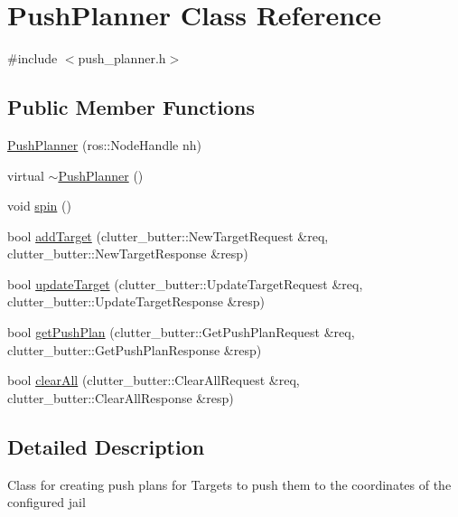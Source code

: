 \hypertarget{classPushPlanner}{\section{Push\-Planner Class Reference}
\label{classPushPlanner}
}


{\ttfamily \#include $<$push\-\_\-planner.\-h$>$}

\subsection*{Public Member Functions}
\begin{DoxyCompactItemize}
\item 
\hyperlink{classPushPlanner_ac1b2ae2c44fd03a47fc04a88a3e4556d}{Push\-Planner} (ros\-::\-Node\-Handle nh)
\item 
virtual \hyperlink{classPushPlanner_ab34cd4e65db16ba204df5ef38b8b3403}{$\sim$\-Push\-Planner} ()
\item 
void \hyperlink{classPushPlanner_a5c65ed5672f0c0abef8f7db8db50863a}{spin} ()
\item 
bool \hyperlink{classPushPlanner_a04c24433673836daac0a8d92a3ddd1c3}{add\-Target} (clutter\-\_\-butter\-::\-New\-Target\-Request \&req, clutter\-\_\-butter\-::\-New\-Target\-Response \&resp)
\item 
bool \hyperlink{classPushPlanner_a537bc4f0e7a8a818d0c7f5c880a379e5}{update\-Target} (clutter\-\_\-butter\-::\-Update\-Target\-Request \&req, clutter\-\_\-butter\-::\-Update\-Target\-Response \&resp)
\item 
bool \hyperlink{classPushPlanner_a4aaf964fb54cb4ed4df10f649460f6cb}{get\-Push\-Plan} (clutter\-\_\-butter\-::\-Get\-Push\-Plan\-Request \&req, clutter\-\_\-butter\-::\-Get\-Push\-Plan\-Response \&resp)
\item 
bool \hyperlink{classPushPlanner_afeb2cc601af98a7e29ecdefdfe9b3b12}{clear\-All} (clutter\-\_\-butter\-::\-Clear\-All\-Request \&req, clutter\-\_\-butter\-::\-Clear\-All\-Response \&resp)
\end{DoxyCompactItemize}


\subsection{Detailed Description}
Class for creating push plans for Targets to push them to the coordinates of the configured jail 

